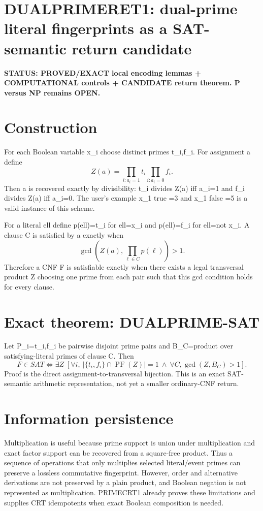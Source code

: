 \documentclass[11pt]{article}
\begin{document}
\section*{DUALPRIMERET1: dual-prime literal fingerprints as a SAT-semantic return candidate}
\textbf{STATUS: PROVED/EXACT local encoding lemmas + COMPUTATIONAL controls + CANDIDATE return theorem. P versus NP remains OPEN.}

\section*{Construction}
For each Boolean variable x_i choose distinct primes t_i,f_i. For assignment a define
\[
Z(a)=\prod_{i:a_i=1}t_i\prod_{i:a_i=0}f_i.
\]
Then a is recovered exactly by divisibility: t_i divides Z(a) iff a_i=1 and f_i divides Z(a) iff a_i=0. The user's example x_1 true =3 and x_1 false =5 is a valid instance of this scheme.

For a literal ell define p(ell)=t_i for ell=x_i and p(ell)=f_i for ell=not x_i. A clause C is satisfied by a exactly when
\[
\gcd\left(Z(a),\prod_{\ell\in C}p(\ell)\right)>1.
\]
Therefore a CNF F is satisfiable exactly when there exists a legal transversal product Z choosing one prime from each pair such that this gcd condition holds for every clause.

\section*{Exact theorem: DUALPRIME-SAT}
Let P_i={t_i,f_i} be pairwise disjoint prime pairs and B_C=product over satisfying-literal primes of clause C. Then
\[
F\in SAT
\Longleftrightarrow
\exists Z\;[
\forall i,\ |\{t_i,f_i\}\cap\operatorname{PF}(Z)|=1
\ \wedge\
\forall C,\gcd(Z,B_C)>1].
\]
Proof is the direct assignment-to-transversal bijection. This is an exact SAT-semantic arithmetic representation, not yet a smaller ordinary-CNF return.

\section*{Information persistence}
Multiplication is useful because prime support is union under multiplication and exact factor support can be recovered from a square-free product. Thus a sequence of operations that only multiplies selected literal/event primes can preserve a lossless commutative fingerprint. However, order and alternative derivations are not preserved by a plain product, and Boolean negation is not represented as multiplication. PRIMECRT1 already proves these limitations and supplies CRT idempotents when exact Boolean composition is needed.
\end{document}
